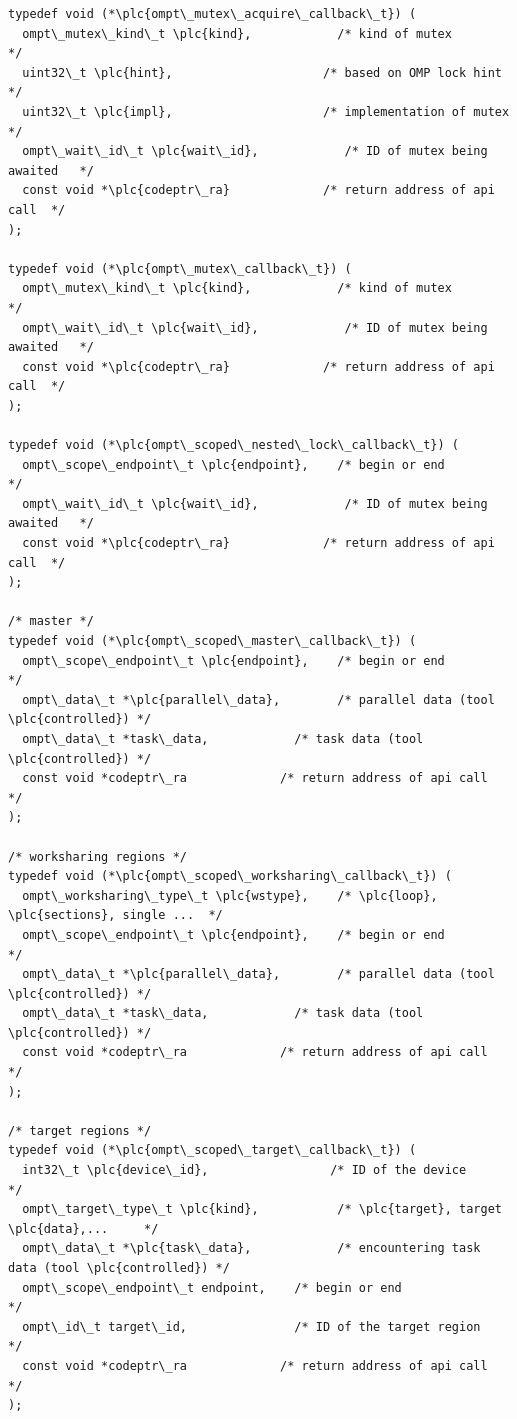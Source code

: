 \documentclass{article}
\begin{document}
\begin{boxedcode}
\begin{verbatim}
typedef void (*\plc{ompt\_mutex\_acquire\_callback\_t}) ( 
  ompt\_mutex\_kind\_t \plc{kind},            /* kind of mutex               */
  uint32\_t \plc{hint},                     /* based on OMP lock hint      */
  uint32\_t \plc{impl},                     /* implementation of mutex     */
  ompt\_wait\_id\_t \plc{wait\_id},            /* ID of mutex being awaited   */
  const void *\plc{codeptr\_ra}             /* return address of api call  */          
);

typedef void (*\plc{ompt\_mutex\_callback\_t}) ( 
  ompt\_mutex\_kind\_t \plc{kind},            /* kind of mutex               */ 
  ompt\_wait\_id\_t \plc{wait\_id},            /* ID of mutex being awaited   */
  const void *\plc{codeptr\_ra}             /* return address of api call  */          
);

typedef void (*\plc{ompt\_scoped\_nested\_lock\_callback\_t}) ( 
  ompt\_scope\_endpoint\_t \plc{endpoint},    /* begin or end                */ 
  ompt\_wait\_id\_t \plc{wait\_id},            /* ID of mutex being awaited   */
  const void *\plc{codeptr\_ra}             /* return address of api call  */          
);

/* master */
typedef void (*\plc{ompt\_scoped\_master\_callback\_t}) ( 
  ompt\_scope\_endpoint\_t \plc{endpoint},    /* begin or end                */
  ompt\_data\_t *\plc{parallel\_data},        /* parallel data (tool \plc{controlled}) */
  ompt\_data\_t *task\_data,            /* task data (tool \plc{controlled}) */
  const void *codeptr\_ra             /* return address of api call  */
);

/* worksharing regions */
typedef void (*\plc{ompt\_scoped\_worksharing\_callback\_t}) (
  ompt\_worksharing\_type\_t \plc{wstype},    /* \plc{loop}, \plc{sections}, single ...  */
  ompt\_scope\_endpoint\_t \plc{endpoint},    /* begin or end                */
  ompt\_data\_t *\plc{parallel\_data},        /* parallel data (tool \plc{controlled}) */
  ompt\_data\_t *task\_data,            /* task data (tool \plc{controlled}) */
  const void *codeptr\_ra             /* return address of api call  */
);

/* target regions */
typedef void (*\plc{ompt\_scoped\_target\_callback\_t}) ( 
  int32\_t \plc{device\_id},                 /* ID of the device            */
  ompt\_target\_type\_t \plc{kind},           /* \plc{target}, target \plc{data},...     */
  ompt\_data\_t *\plc{task\_data},            /* encountering task data (tool \plc{controlled}) */
  ompt\_scope\_endpoint\_t endpoint,    /* begin or end                */ 
  ompt\_id\_t target\_id,               /* ID of the target region     */
  const void *codeptr\_ra             /* return address of api call  */
);


\end{verbatim}
\end{boxedcode}
\end{document}

